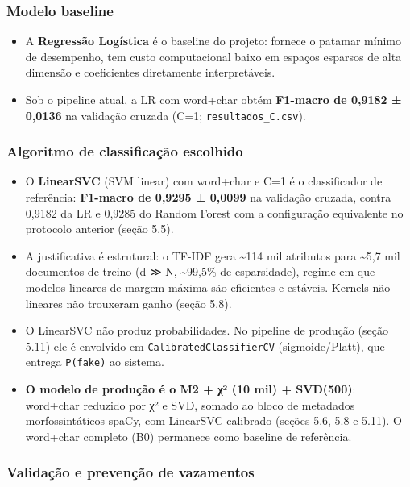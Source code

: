 \documentclass[
  brazilian,
  11pt,
]{article}
\providecommand{\tightlist}{%
  \setlength{\itemsep}{0pt}\setlength{\parskip}{0pt}}
\begin{document}
\subsubsection{Modelo baseline}\label{modelo-baseline}

\begin{itemize}
\tightlist
\item
  A \textbf{Regressão Logística} é o baseline do projeto: fornece o patamar mínimo de desempenho, tem custo computacional baixo em espaços esparsos de alta dimensão e coeficientes diretamente interpretáveis.
\item
  Sob o pipeline atual, a LR com word+char obtém \textbf{F1-macro de 0,9182 ± 0,0136} na validação cruzada (C=1; \texttt{resultados\_C.csv}).
\end{itemize}

\subsubsection{Algoritmo de classificação escolhido}\label{algoritmo-de-classificauxe7uxe3o-escolhido}

\begin{itemize}
\tightlist
\item
  O \textbf{LinearSVC} (SVM linear) com word+char e C=1 é o classificador de referência: \textbf{F1-macro de 0,9295 ± 0,0099} na validação cruzada, contra 0,9182 da LR e 0,9285 do Random Forest com a configuração equivalente no protocolo anterior (seção 5.5).
\item
  A justificativa é estrutural: o TF-IDF gera \textasciitilde114 mil atributos para \textasciitilde5,7 mil documentos de treino (d ≫ N, \textasciitilde99,5\% de esparsidade), regime em que modelos lineares de margem máxima são eficientes e estáveis. Kernels não lineares não trouxeram ganho (seção 5.8).
\item
  O LinearSVC não produz probabilidades. No pipeline de produção (seção 5.11) ele é envolvido em \texttt{CalibratedClassifierCV} (sigmoide/Platt), que entrega \texttt{P(fake)} ao sistema.
\item
  \textbf{O modelo de produção é o M2 + χ² (10 mil) + SVD(500)}: word+char reduzido por χ² e SVD, somado ao bloco de metadados morfossintáticos spaCy, com LinearSVC calibrado (seções 5.6, 5.8 e 5.11). O word+char completo (B0) permanece como baseline de referência.
\end{itemize}

\subsubsection{Validação e prevenção de vazamentos}\label{validauxe7uxe3o-e-prevenuxe7uxe3o-de-vazamentos}
\end{document}
